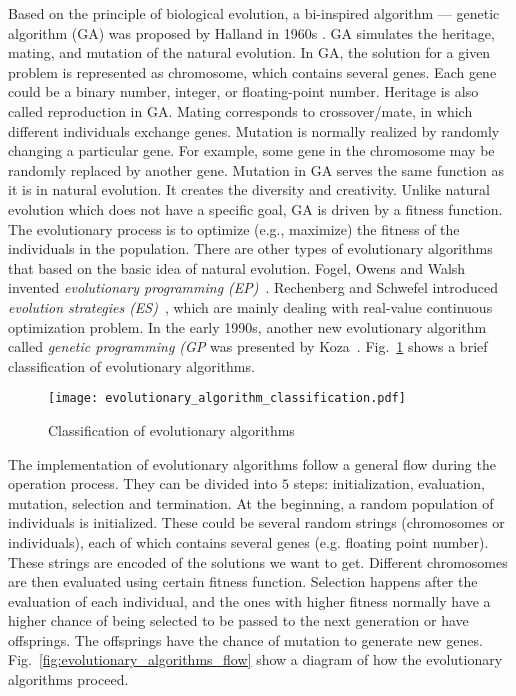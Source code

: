 Based on the principle of biological evolution, a bi-inspired algorithm ---  genetic algorithm (GA) was proposed by Halland in 1960s \cite{Halland_1992}. GA simulates the heritage, mating, and mutation of the natural evolution. In GA, the solution for a given problem is represented as chromosome, which contains several genes. Each gene could be a binary number, integer, or floating-point number. Heritage is also called reproduction in GA. Mating corresponds to crossover/mate, in which different individuals exchange genes. Mutation is normally realized by randomly changing a particular gene. For example, some gene in the chromosome may be randomly replaced by another gene. Mutation in GA serves the same function as it is in natural evolution. It creates the diversity and creativity. Unlike natural evolution which does not have a specific goal, GA is driven by a fitness function. The evolutionary process is to optimize (e.g., maximize) the fitness of the individuals in the population. There are other types of evolutionary algorithms that based on the basic idea of natural evolution. Fogel, Owens and Walsh invented \textit{evolutionary programming (EP)}~\cite{Fogel1966}. Rechenberg and Schwefel introduced \textit{evolution strategies (ES)}~\cite{Rechenberg1994}, which are mainly dealing with real-value continuous optimization problem. In the early 1990s, another new evolutionary algorithm called \textit{genetic programming (GP} was presented by Koza~\cite{Koza1992}. Fig.~\ref{fig:evolutionary_algorithm_classification} shows a brief classification of evolutionary algorithms. 

\begin{figure}[htbp]
  \centering
  \texttt{[image: evolutionary\_algorithm\_classification.pdf]}
  \caption{Classification of evolutionary algorithms}
  \label{fig:evolutionary_algorithm_classification}
\end{figure}

The implementation of evolutionary algorithms follow a general flow during the operation process. They can be divided into $5$ steps: initialization, evaluation, mutation, selection and termination. At the beginning, a random population of individuals is initialized. These could be several random strings (chromosomes or individuals), each of which contains several genes (e.g. floating point number). These strings are encoded of the solutions we want to get. Different chromosomes are then evaluated using certain fitness function. Selection happens after the evaluation of each individual, and the ones with higher fitness normally have a higher chance of being selected to be passed to the next generation or have offsprings. The offsprings have the chance of mutation to generate new genes.  Fig.~\ref{fig:evolutionary_algorithms_flow} show a diagram of how the evolutionary algorithms proceed. 

